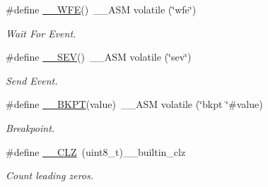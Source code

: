\begin{DoxyCompactItemize}
\#define \hyperlink{group___c_m_s_i_s___core___instruction_interface_gaf0330712223f4cfb6091e4ab84775f73}{\+\_\+\+\_\+\+W\+FE}()~\+\_\+\+\_\+\+A\+SM volatile (\char`\"{}wfe\char`\"{})
\begin{DoxyCompactList}\small\item\em Wait For Event. \end{DoxyCompactList}\item 
\#define \hyperlink{group___c_m_s_i_s___core___instruction_interface_gafa58e60fcd2176ad58f96947466ea1fa}{\+\_\+\+\_\+\+S\+EV}()~\+\_\+\+\_\+\+A\+SM volatile (\char`\"{}sev\char`\"{})
\begin{DoxyCompactList}\small\item\em Send Event. \end{DoxyCompactList}\item 
\#define \hyperlink{group___c_m_s_i_s___core___instruction_interface_ga15ea6bd3c507d3e81c3b3a1258e46397}{\+\_\+\+\_\+\+B\+K\+PT}(value)~\+\_\+\+\_\+\+A\+SM volatile (\char`\"{}bkpt \char`\"{}\#value)
\begin{DoxyCompactList}\small\item\em Breakpoint. \end{DoxyCompactList}\item 
\#define \hyperlink{group___c_m_s_i_s___core___instruction_interface_ga5d5bb1527e042be4a9fa5a33f65cc248}{\+\_\+\+\_\+\+C\+LZ}~(uint8\+\_\+t)\+\_\+\+\_\+builtin\+\_\+clz
\begin{DoxyCompactList}\small\item\em Count leading zeros. \end{DoxyCompactList}\end{DoxyCompactItemize}
